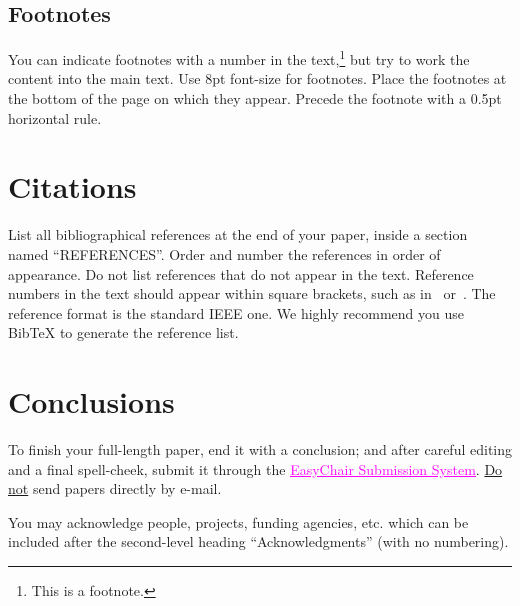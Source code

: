 \documentclass{article}
\begin{document}

\subsection{Footnotes}
You can indicate footnotes with a number in the text,\footnote{This is a footnote.}
but try to work the content into the main text.
Use 8pt font-size for footnotes. 
Place the footnotes at the bottom of the page 
on which they appear. 
Precede the footnote with a 0.5pt horizontal rule.

\section{Citations}
List all bibliographical references at the end of your paper,
inside a section named ``REFERENCES''.
Order and number the references in order of appearance. 
Do not list references that do not appear in the text.
Reference numbers in the text should appear within square brackets, such as 
in~\cite{Someone:13} or~\cite{Someone:13,Someone:04,Someone:09}.
The reference format is the standard IEEE one. 
We highly recommend you use BibTeX 
to generate the reference list.

\section{Conclusions}
To finish your full-length paper, end it with a conclusion;
and after careful editing and a final spell-cheek,
submit it through the \href{https://easychair.org/conferences/?conf=tenor2015}{\textcolor {magenta} {\underline {EasyChair Submission System}}}. 
\underline{Do not} send papers directly by e-mail.
%
\begin{acknowledgments}
You may acknowledge people, projects, 
funding agencies, etc. 
which can be included after the second-level heading
``Acknowledgments'' (with no numbering).
\end{acknowledgments} 


\end{document}
